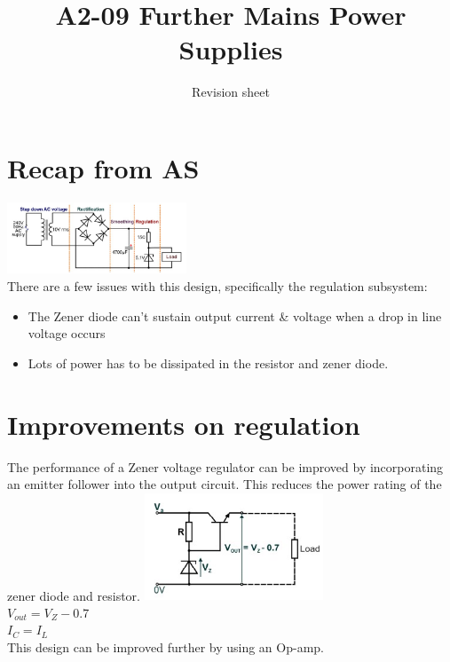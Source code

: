 \documentclass[a4paper, 11pt, twocolumn]{article}
\title{A2-09 Further Mains Power Supplies}
\author{Revision sheet}
\date{}
\begin{document}
    
    \maketitle

    \section{Recap from AS}
    \thispagestyle{fancy}
    \includegraphics[width=0.4\textwidth]{recapFromAS.jpg} \\
    There are a few issues with this design, specifically the regulation subsystem:
    \begin{itemize}
        \item The Zener diode can't sustain output current \& voltage when a drop in line voltage occurs
        \item Lots of power has to be dissipated in the resistor and zener diode.
    \end{itemize}

    \section{Improvements on regulation}
    The performance of a Zener voltage regulator can be improved by incorporating an emitter follower into the output circuit. This reduces the power rating of the zener diode and resistor.
    \includegraphics[width=0.4\textwidth]{emitterFollower1.jpg} \\
    $V_{out} = V_Z - 0.7$\\
    $I_C = I_L$\\
    This design can be improved further by using an Op-amp.
\end{document}
